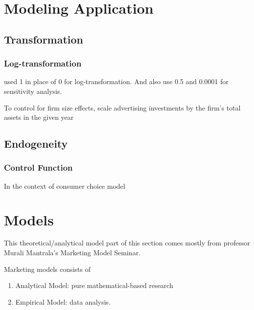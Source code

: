 \documentclass[
]{book}
\providecommand{\tightlist}{%
  \setlength{\itemsep}{0pt}\setlength{\parskip}{0pt}}
\begin{document}
\hypertarget{modeling-application}{%
\chapter{Modeling Application}\label{modeling-application}}

\hypertarget{transformation}{%
\section{Transformation}\label{transformation}}

\hypertarget{log-transformation}{%
\subsection{Log-transformation}\label{log-transformation}}

\citep{Manchanda_2004, Wies_2019} used 1 in place of 0 for log-transformation. And also use 0.5 and 0.0001 for sensitivity analysis.

To control for firm size effects, \citep{Wies_2019} scale advertising investments by the firm's total assets in the given year

\hypertarget{endogeneity}{%
\section{Endogeneity}\label{endogeneity}}

\hypertarget{control-function}{%
\subsection{Control Function}\label{control-function}}

In the context of consumer choice model \citep{Petrin_2010}

\hypertarget{models}{%
\chapter{Models}\label{models}}

This theoretical/analytical model part of this section comes mostly from professor Murali Mantrala's Marketing Model
Seminar.

Marketing models consists of

\begin{enumerate}
\def\labelenumi{\arabic{enumi}.}
\tightlist
\item
  Analytical Model: pure mathematical-based research
\item
  Empirical Model: data analysis.
\end{enumerate}
\end{document}
